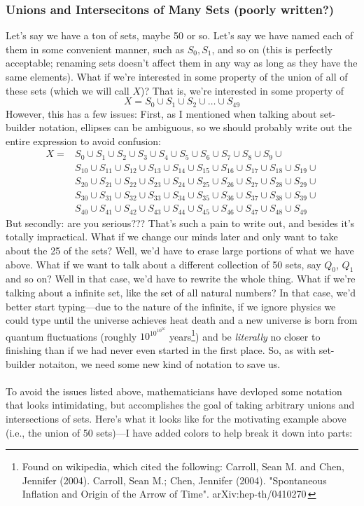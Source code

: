 \documentclass[10pt]{article}
\theoremstyle{definition}
\begin{document}
\subsubsection{Unions and Intersecitons of Many Sets (poorly written?)}
Let's say we have a ton of sets, maybe 50 or so.  Let's say we have named each of them in some convenient manner, such as $S_0, S_1$, and so on (this is perfectly acceptable; renaming sets doesn't affect them in any way as long as they have the same elements).  What if we're interested in some property of the union of all of these sets (which we will call $X$)?  That is, we're interested in some property of 
\[X = S_0\cup S_1\cup S_2 \cup \ldots \cup S_{49}\]
However, this has a few issues: First, as I mentioned when talking about set-builder notation, ellipses can be ambiguous, so we should probably write out the entire expression to avoid confusion:
\begin{align*}
X =&S_0\cup S_1\cup S_2 \cup S_3 \cup S_4 \cup S_5 \cup S_6 \cup S_7 \cup S_8 \cup S_9 \cup \\
&S_{10}\cup S_{11}\cup S_{12} \cup S_{13} \cup S_{14} \cup S_{15} \cup S_{16} \cup S_{17} \cup S_{18} \cup S_{19} \cup \\
&S_{20}\cup S_{21}\cup S_{22} \cup S_{23} \cup S_{24} \cup S_{25} \cup S_{26} \cup S_{27} \cup S_{28} \cup S_{29} \cup \\
&S_{30}\cup S_{31}\cup S_{32} \cup S_{33} \cup S_{34} \cup S_{35} \cup S_{36} \cup S_{37} \cup S_{38} \cup S_{39} \cup \\
&S_{40}\cup S_{41}\cup S_{42} \cup S_{43} \cup S_{44} \cup S_{45} \cup S_{46} \cup S_{47} \cup S_{48} \cup S_{49} 
\end{align*}  
But secondly: are you serious??? That's such a pain to write out, and besides it's totally impractical.  What if we change our minds later and only want to take about the 25 of the sets? Well, we'd have to erase large portions of what we have above.  What if we want to talk about a different collection of 50 sets, say $Q_0$, $Q_1$ and so on?  Well in that case, we'd have to rewrite the whole thing.  What if we're talking about a infinite set, like the set of all natural numbers?  In that case, we'd better start typing---due to the nature of the infinite, if we ignore physics we could type until the universe achieves heat death and a new universe is born from quantum fluctuations (roughly $\displaystyle 10^{10^{10^{56}}}$ years\footnote{Found on wikipedia, which cited the following: Carroll, Sean M. and Chen, Jennifer (2004). Carroll, Sean M.; Chen, Jennifer (2004). "Spontaneous Inflation and Origin of the Arrow of Time". arXiv:hep-th/0410270 }) and be \emph{literally} no closer to finishing than if we had never even started in the first place.  So, as with set-builder notaiton, we need some new kind of notation to save us.\\~\\  To avoid the issues listed above, mathematicians have devloped some notation that looks intimidating, but accomplishes the goal of taking arbitrary unions and intersections of sets.  Here's what it looks like for the motivating example above (i.e., the union of 50 sets)---I have added colors to help break it down into parts:
\end{document}

